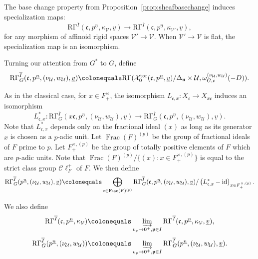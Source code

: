 \documentclass[11pt]{amsart}
\theoremstyle{definition} %
\theoremstyle{plain} %
\theoremstyle{remark} %
\newcommand{\cU}{{\mathcal U}}
\newcommand{\cV}{{\mathcal V}}
\newcommand{\cX}{{\mathcal X}}
\newcommand{\frakc}{\mathfrak c}
\newcommand{\frakn}{\mathfrak n}
\newcommand{\frakp}{\mathfrak p}
\newcommand{\defeq}{\colonequals} %
\newcommand{\tor}{\mathrm{tor}} %
\newcommand{\id}{\mathrm{id}} %
\DeclareMathOperator\Frac{Frac} %
\newcommand{\RG}{\mathrm{R\Gamma}}
\newcommand{\Cl}{\mathscr{C}\!\ell_F^+}
\begin{document}
The base change property from Proposition~\ref{prop:sheafbasechange} induces specialization maps:
\[
  \RG^{\overline{I}}(\frakc,p^{\underline{n}}, \kappa_\cV,\underline{v})
  \rightarrow   \RG^{\overline{I}}(\frakc,p^{\underline{n}}, \kappa_{\cV'},\underline{v}),
\]
for any morphism of affinoid rigid spaces $\cV' \rightarrow \cV$.
When $\cV' \rightarrow \cV$ is flat, the specialization map is an isomorphism.

Turning our attention from $G^\ast$ to $G$, define
\[
  \RG_G^{\overline{I}}(\frakc,p^{\underline{n}}, (\nu_\cU,w_\cU),\underline{v})
\defeq 
\RG(\cX_0^\tor(\frakc,p^{\underline{n}},\underline{v})/{\Delta_\frakn}\times \cU, \omega_{G,\frakc}^{(\nu_\cU,w_\cU)}(-D)).
\] 

As in the classical case, for $x\in F_+^{\times}$, the isomorphism $L_{\frakc,x}\colon X_{\frakc} \rightarrow X_{x\frakc}$ induces an isomorphism
\[
L_{\frakc,x}^\ast \colon \RG_G^{\overline{I}}(x\frakc,p^{\underline{n}}, (\nu_\cU,w_\cU),\underline{v}) \rightarrow \RG_G^{\overline{I}}(\frakc,p^{\underline{n}},(\nu_\cU,w_\cU),\underline{v}).
\]
Note that $L_{\frakc,x}^\ast$ depends only on the fractional ideal $(x)$ as long as its generator $x$ is chosen as a $p$-adic unit.
Let $\Frac(F)^{(p)}$ be the group of fractional ideals of $F$ prime to $p$.
Let $F_+^{\times,(p)}$ be the group of totally positive elements of $F$ which are $p$-adic units. 
Note that $\Frac(F)^{(p)}/\{(x)\colon x\in F_+^{\times,(p)}\}$ is equal to the strict class group $\Cl$ of $F$.
We then define
\[
\RG_G^{\overline{I}}(p^{\underline{n}},  (\nu_\cU,w_\cU),\underline{v})\defeq
\bigoplus_{\frakc\in \Frac(F)^{(p)}}\RG_G^{\overline{I}}(\frakc,p^{\underline{n}}, (\nu_\cU,w_\cU),\underline{v})/\left(L_{\frakc,x}^\ast - \id\right)_{x\in F_+^{\times,(p)}}.
\]

We also define
\[
   \RG^{\overline{I}}(\frakc, p^{\underline{n}}, \kappa_\cV) \defeq \varinjlim_{v_\frakp\rightarrow 0^+, \frakp\in I}    \RG^{\overline{I}}(\frakc,p^{\underline{n}}, \kappa_\cV,\underline{v}),
\]
\begin{equation}\label{G-families}
  \RG_G^{\overline{I}}( p^{\underline{n}}, (\nu_\cU,w_\cU)) \defeq \varinjlim_{v_\frakp\rightarrow 0^+, \frakp\in I}   \RG_G^{\overline{I}}( p^{\underline{n}}, (\nu_\cU,w_\cU),\underline{v}).
\end{equation} 
\end{document}
